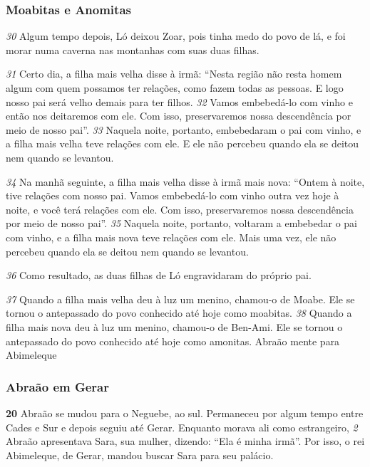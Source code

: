 \bigskip   
\subsubsection*{Moabitas e Anomitas}
\textit{\tiny 30}
Algum tempo depois, Ló deixou Zoar, pois tinha medo do povo de lá, e foi morar
numa caverna nas montanhas com suas duas filhas. 

\bigskip   
\textit{\tiny 31}
Certo dia, a filha mais velha
disse à irmã: “Nesta região não resta homem algum com quem possamos ter
relações, como fazem todas as pessoas. E logo nosso pai será velho demais para
ter filhos. 
\textit{\tiny 32}
Vamos embebedá-lo com vinho e então nos deitaremos com ele. Com
isso, preservaremos nossa descendência por meio de nosso pai”.
\textit{\tiny 33}
Naquela noite, portanto, embebedaram o pai com vinho, e a filha mais velha
teve relações com ele. E ele não percebeu quando ela se deitou nem quando se
levantou.

\bigskip   
\textit{\tiny 34}
Na manhã seguinte, a filha mais velha disse à irmã mais nova: “Ontem à noite,
tive relações com nosso pai. Vamos embebedá-lo com vinho outra vez hoje à
noite, e você terá relações com ele. Com isso, preservaremos nossa descendência
por meio de nosso pai”.
\textit{\tiny 35}
Naquela noite, portanto, voltaram a embebedar o pai com vinho, e a filha
mais nova teve relações com ele. Mais uma vez, ele não percebeu quando ela se
deitou nem quando se levantou.

\bigskip   
\textit{\tiny 36}
Como resultado, as duas filhas de Ló engravidaram do próprio pai. 

\bigskip   
\textit{\tiny 37}
Quando
a filha mais velha deu à luz um menino, chamou-o de Moabe. Ele se tornou o
antepassado do povo conhecido até hoje como moabitas. 
\textit{\tiny 38}
Quando a filha mais
nova deu à luz um menino, chamou-o de Ben-Ami. Ele se tornou o antepassado
do povo conhecido até hoje como amonitas.
Abraão mente para Abimeleque
   
\bigskip   
\subsubsection*{Abraão em Gerar}
\textbf{\large 20}
 Abraão se mudou para o Neguebe, ao sul. Permaneceu por algum tempo
entre Cades e Sur e depois seguiu até Gerar. Enquanto morava ali como
estrangeiro, 
\textit{\tiny 2}
Abraão apresentava Sara, sua mulher, dizendo: “Ela é minha irmã”.
Por isso, o rei Abimeleque, de Gerar, mandou buscar Sara para seu palácio.

